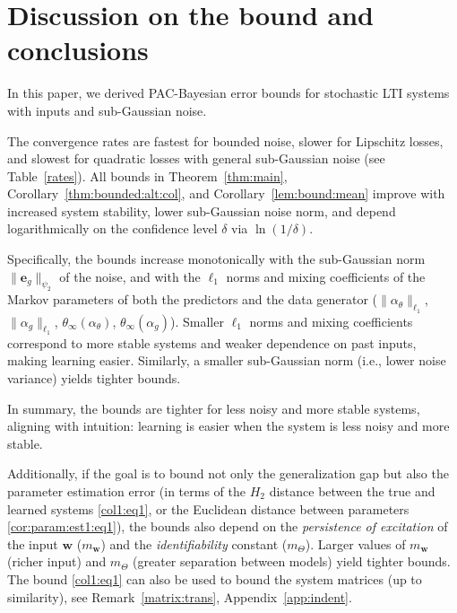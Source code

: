 \documentclass{article}
\def\rvw{{\mathbf{w}}}
\newcommand{\e}{\mathbf{e}}
\newcommand{\w}{\mathbf{w}}
\begin{document}
  
\section{Discussion on the bound  and conclusions}
\label{sec:conclusions}
In this paper, we derived PAC-Bayesian error bounds for stochastic LTI systems with inputs and sub-Gaussian noise.
\par
The convergence rates are fastest for bounded noise, slower for Lipschitz losses, and slowest for quadratic losses with general sub-Gaussian noise (see Table~\ref{rates}).
All bounds in Theorem~\ref{thm:main}, Corollary~\ref{thm:bounded:alt:col}, and Corollary~\ref{lem:bound:mean} improve with increased system stability, lower sub-Gaussian noise norm, and depend logarithmically on the confidence level $\delta$ via $\ln(1/\delta)$.
\par
Specifically, the bounds increase monotonically with the sub-Gaussian norm $\|\e_g\|_{\psi_2}$ of the noise, and with the $\ell_1$ norms and mixing coefficients of the Markov parameters of both the predictors and the data generator ($\|\alpha_\theta\|_{\ell_1}$, $\|\alpha_g\|_{\ell_1}$, $\theta_{\infty}(\alpha_\theta)$, $\theta_{\infty}(\alpha_g)$). Smaller $\ell_1$ norms and mixing coefficients correspond to more stable systems and weaker dependence on past inputs, making learning easier. Similarly, a smaller sub-Gaussian norm (i.e., lower noise variance) yields tighter bounds.
\par 
In summary, the bounds are tighter for less noisy and more stable systems, aligning with intuition: learning is easier when the system is less noisy and more stable.

Additionally, if the goal is to bound not only the generalization gap but also the parameter estimation error (in terms of the $H_2$ distance between the true and learned systems \eqref{col1:eq1}, or the Euclidean distance between parameters \eqref{cor:param:est1:eq1}), the bounds also depend on the \emph{persistence of excitation} of the input $\w$ ($m_{\rvw}$) and the \emph{identifiability} constant ($m_{\Theta}$). Larger values of $m_{\rvw}$ (richer input) and $m_{\Theta}$ (greater separation between models) yield tighter bounds. The bound \eqref{col1:eq1} can also be used to bound the system matrices (up to similarity), see Remark~\ref{matrix:trans}, Appendix~\ref{app:indent}.

\end{document}
